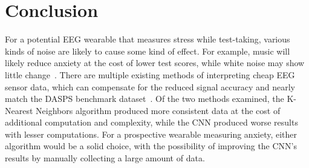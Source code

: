 \documentclass[journal]{IEEEtran}
\begin{document}
\section{Conclusion}
For a potential EEG wearable that measures stress while test-taking, various kinds of noise are likely to cause some kind of effect. For example, music will likely reduce anxiety at the cost of lower test scores, while white noise may show little change~\cite{ShahrokhiShabnam2022Teow}. There are multiple existing methods of interpreting cheap EEG sensor data, which can compensate for the reduced signal accuracy and nearly match the DASPS benchmark dataset~\cite{ChatterjeeDebatri2023Doms, GhonchiHamidreza2025MMCA}. Of the two methods examined, the K-Nearest Neighbors algorithm produced more consistent data at the cost of additional computation and complexity, while the CNN produced worse results with lesser computations. For a prospective wearable measuring anxiety, either algorithm would be a solid choice, with the possibility of improving the CNN's results by manually collecting a large amount of data.



\end{document}
